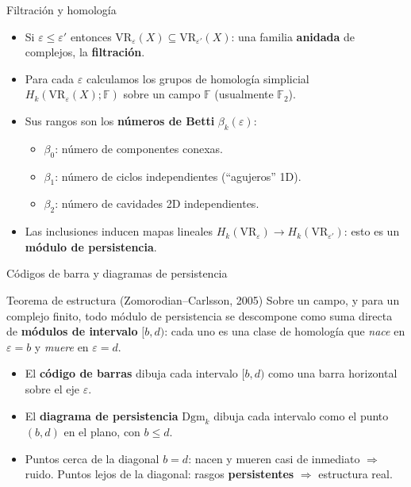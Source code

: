 \documentclass[aspectratio=169,11pt]{beamer}
\newcommand{\defterm}[1]{\textbf{\color{accent}#1}}
\begin{document}
\begin{frame}{Filtración y homología}
  \begin{itemize}
    \item Si $\varepsilon\le\varepsilon'$ entonces
      $\mathrm{VR}_\varepsilon(X)\subseteq \mathrm{VR}_{\varepsilon'}(X)$:
      una familia \defterm{anidada} de complejos, la \defterm{filtración}.
    \item Para cada $\varepsilon$ calculamos los grupos de homología
      simplicial $H_k(\mathrm{VR}_\varepsilon(X);\mathbb{F})$ sobre un campo
      $\mathbb{F}$ (usualmente $\mathbb{F}_2$).
    \item Sus rangos son los \defterm{números de Betti}
      $\beta_k(\varepsilon)$:
      \begin{itemize}
        \item $\beta_0$: número de componentes conexas.
        \item $\beta_1$: número de ciclos independientes (``agujeros'' 1D).
        \item $\beta_2$: número de cavidades 2D independientes.
      \end{itemize}
    \item Las inclusiones inducen mapas lineales
      $H_k(\mathrm{VR}_\varepsilon)\to H_k(\mathrm{VR}_{\varepsilon'})$: esto
      es un \defterm{módulo de persistencia}.
  \end{itemize}
\end{frame}

\begin{frame}{Códigos de barra y diagramas de persistencia}
  \begin{block}{Teorema de estructura (Zomorodian--Carlsson, 2005)}
    Sobre un campo, y para un complejo finito, todo módulo de persistencia
    se descompone como suma directa de \defterm{módulos de intervalo}
    $[b,d)$: cada uno es una clase de homología que \emph{nace} en
    $\varepsilon=b$ y \emph{muere} en $\varepsilon=d$.
  \end{block}
  \begin{itemize}
    \item El \defterm{código de barras} dibuja cada intervalo $[b,d)$ como
      una barra horizontal sobre el eje $\varepsilon$.
    \item El \defterm{diagrama de persistencia} $\mathrm{Dgm}_k$ dibuja cada
      intervalo como el punto $(b,d)$ en el plano, con $b\le d$.
    \item Puntos cerca de la diagonal $b=d$: nacen y mueren casi de
      inmediato $\Rightarrow$ ruido. Puntos lejos de la diagonal: rasgos
      \textbf{persistentes} $\Rightarrow$ estructura real.
  \end{itemize}
\end{frame}
\end{document}
